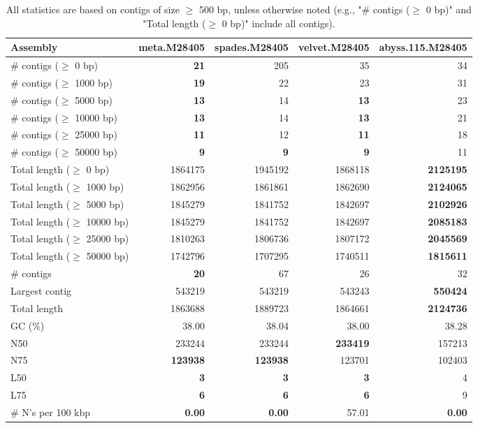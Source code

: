 \documentclass[12pt,a4paper]{article}
\begin{document}
\begin{table}[ht]
\begin{center}
\caption{All statistics are based on contigs of size $\geq$ 500 bp, unless otherwise noted (e.g., "\# contigs ($\geq$ 0 bp)" and "Total length ($\geq$ 0 bp)" include all contigs).}
\begin{tabular}{|l*{4}{|r}|}
\hline
Assembly & meta.M28405 & spades.M28405 & velvet.M28405 & abyss.115.M28405 \\ \hline
\# contigs ($\geq$ 0 bp) & {\bf 21} & 205 & 35 & 34 \\ \hline
\# contigs ($\geq$ 1000 bp) & {\bf 19} & 22 & 23 & 31 \\ \hline
\# contigs ($\geq$ 5000 bp) & {\bf 13} & 14 & {\bf 13} & 23 \\ \hline
\# contigs ($\geq$ 10000 bp) & {\bf 13} & 14 & {\bf 13} & 21 \\ \hline
\# contigs ($\geq$ 25000 bp) & {\bf 11} & 12 & {\bf 11} & 18 \\ \hline
\# contigs ($\geq$ 50000 bp) & {\bf 9} & {\bf 9} & {\bf 9} & 11 \\ \hline
Total length ($\geq$ 0 bp) & 1864175 & 1945192 & 1868118 & {\bf 2125195} \\ \hline
Total length ($\geq$ 1000 bp) & 1862956 & 1861861 & 1862690 & {\bf 2124065} \\ \hline
Total length ($\geq$ 5000 bp) & 1845279 & 1841752 & 1842697 & {\bf 2102926} \\ \hline
Total length ($\geq$ 10000 bp) & 1845279 & 1841752 & 1842697 & {\bf 2085183} \\ \hline
Total length ($\geq$ 25000 bp) & 1810263 & 1806736 & 1807172 & {\bf 2045569} \\ \hline
Total length ($\geq$ 50000 bp) & 1742796 & 1707295 & 1740511 & {\bf 1815611} \\ \hline
\# contigs & {\bf 20} & 67 & 26 & 32 \\ \hline
Largest contig & 543219 & 543219 & 543243 & {\bf 550424} \\ \hline
Total length & 1863688 & 1889723 & 1864661 & {\bf 2124736} \\ \hline
GC (\%) & 38.00 & 38.04 & 38.00 & 38.28 \\ \hline
N50 & 233244 & 233244 & {\bf 233419} & 157213 \\ \hline
N75 & {\bf 123938} & {\bf 123938} & 123701 & 102403 \\ \hline
L50 & {\bf 3} & {\bf 3} & {\bf 3} & 4 \\ \hline
L75 & {\bf 6} & {\bf 6} & {\bf 6} & 9 \\ \hline
\# N's per 100 kbp & {\bf 0.00} & {\bf 0.00} & 57.01 & {\bf 0.00} \\ \hline
\end{tabular}
\end{center}
\end{table}
\end{document}
